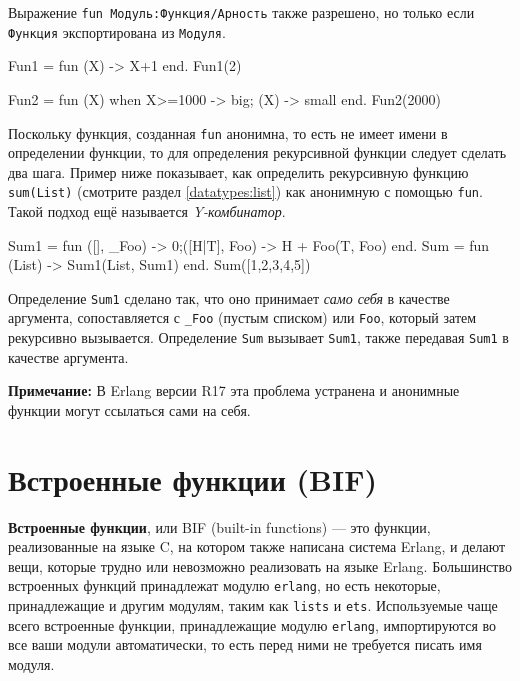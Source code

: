Выражение \texttt{fun Модуль:Функция/Арность} также разрешено, но только если 
\texttt{Функция} экспортирована из \texttt{Модуля}.

\begin{erlang}
Fun1 = fun (X) -> X+1 end.
Fun1(2)         %

Fun2 = fun (X) when X>=1000 -> big; (X) -> small end.
Fun2(2000)      %
\end{erlang}

Поскольку функция, созданная  \texttt{fun} анонимна, то есть не имеет имени в 
определении функции, то для определения рекурсивной функции следует сделать два
шага.  Пример ниже показывает, как определить рекурсивную функцию 
\texttt{sum(List)} (смотрите раздел \ref{datatypes:list}) как анонимную с 
помощью \texttt{fun}. Такой подход ещё называется \emph{Y-комбинатор}.

\begin{erlang}
Sum1 = fun ([], _Foo) -> 0;([H|T], Foo) -> H + Foo(T, Foo) end.
Sum = fun (List) -> Sum1(List, Sum1) end.
Sum([1,2,3,4,5])    %
\end{erlang}

Определение \texttt{Sum1} сделано так, что оно принимает \emph{само себя} в
качестве аргумента, сопоставляется с \texttt{\_Foo} (пустым списком) или
\texttt{Foo}, который затем рекурсивно вызывается.  Определение \texttt{Sum} 
вызывает \texttt{Sum1}, также передавая \texttt{Sum1} в качестве аргумента.

\textbf{Примечание:} В Erlang версии R17 эта проблема устранена и анонимные 
функции могут ссылаться сами на себя.



\section{Встроенные функции (BIF)}
\label{functions:bifs}

\textbf{Встроенные функции}, или BIF (built-in functions) --- это функции, 
реализованные на языке C, на котором также написана система Erlang, и делают 
вещи, которые трудно или невозможно реализовать на языке Erlang.  Большинство
встроенных функций принадлежат модулю \texttt{erlang}, но есть некоторые,
принадлежащие и другим модулям, таким как \texttt{lists} и \texttt{ets}. 
Используемые чаще всего встроенные функции, принадлежащие модулю 
\texttt{erlang}, импортируются во все ваши модули автоматически, то есть перед
ними не требуется писать имя модуля.


